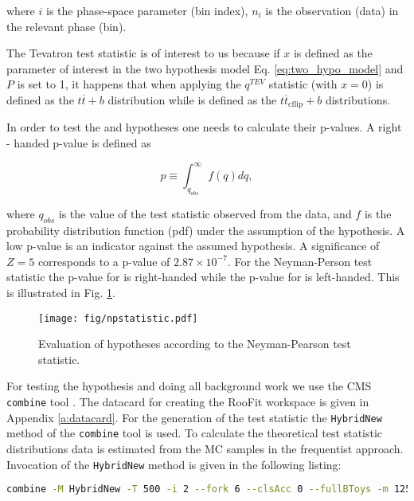 where $i$ is the phase-space parameter (bin index), $n_{i}$ is the observation (data) in the relevant phase (bin).

The Tevatron test statistic is of interest to us because if $x$ is defined as the parameter of interest in the two hypothesis model Eq. \ref{eq:two_hypo_model} and $P$ is set to 1, it happens  that when applying the $q^{TEV}$ statistic \Hnull (with $x=0$) is defined as the $t\overline{t} + b$ distribution while \Halt is defined as the $t\overline{t}_{\text{cflip}} + b$ distributions.

In order to test the \Hnull and \Halt hypotheses one needs to calculate their p-values. A right - handed p-value is defined as

\begin{equation}
p\equiv\int_{q_{obs}}^{\infty}f(q)dq,
\end{equation}
    
where $q_{obs}$ is the value of the test statistic observed from the data, and $f$ is the probability distribution function (pdf) under the assumption of the hypothesis. A low p-value is an indicator against the assumed hypothesis. A significance of $Z=5$ corresponds to a p-value of $2.87\times10^{-7}$. For the Neyman-Person test statistic the p-value for \Hnull is right-handed while the p-value for \Halt is left-handed. This is illustrated in Fig. \ref{fig:npstatistic}.

\begin{figure}
  \centering
  \texttt{[image: fig/npstatistic.pdf]}
  \caption{Evaluation of hypotheses according to the Neyman-Pearson test statistic.}
  \label{fig:npstatistic}
\end{figure}

For testing the hypothesis and doing all background work we use the CMS \lstinline[language=sh]|combine| tool \cite{url:combine}. The datacard for creating the RooFit \cite{url:roofit} workspace is given in Appendix \ref{a:datacard}. For the generation of the test statistic the \lstinline[language=sh]|HybridNew| method of the \lstinline[language=sh]|combine| tool is used. To calculate the theoretical test statistic distributions data is estimated from the MC samples in the frequentist approach. Invocation of the \lstinline[language=sh]|HybridNew| method is given in the following listing:

\begin{lstlisting}[language=sh, breaklines=true]
  combine -M HybridNew -T 500 -i 2 --fork 6 --clsAcc 0 --fullBToys -m 125.7 TwoHypo.root --seed 8192 --testStat=TEV  --saveHybridResult --singlePoint 1
\end{lstlisting}

